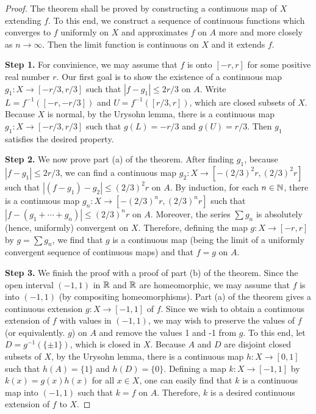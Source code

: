 \begin{proof}
    The theorem shall be proved by constructing a continuous map of $X$ extending $f$.
    To this end, we construct a sequence of continuous functions which converges to $f$ uniformly on $X$ and approximates $f$ on $A$ more and more closely as $n\rightarrow\infty$.
    Then the limit function is continuous on $X$ and it extends $f$.

    \textbf{Step 1.}
    For convinience, we may assume that $f$ is onto $[-r, r]$ for some positive real number $r$.
    Our first goal is to show the existence of a continuous map $g_1: X\rightarrow[-r/3, r/3]$ such that $|f-g_1|\leq 2r/3$ on $A$.
    Write $L=f^{-1}([-r, -r/3])$ and $U=f^{-1}([r/3, r])$, which are closed subsets of $X$.
    Because $X$ is normal, by the Urysohn lemma, there is a continuous map $g_1: X\rightarrow [-r/3, r/3]$ such that $g(L)=-r/3$ and $g(U)=r/3$.
    Then $g_1$ satisfies the desired property.

    \textbf{Step 2.}
    We now prove part (a) of the theorem.
    After finding $g_1$, because $|f-g_1|\leq 2r/3$, we can find a continuous map $g_2: X\rightarrow [-(2/3)^2 r, (2/3)^2 r]$ such that $|(f-g_1)-g_2|\leq (2/3)^2 r$ on $A$.
    By induction, for each $n\in{\mathbb{N}}$, there is a continuous map $g_n: X\rightarrow [-(2/3)^n r, (2/3)^n r]$ such that $|f-(g_1+\cdots+g_n)|\leq(2/3)^n r$ on $A$.
    Moreover, the series $\sum g_n$ is absolutely (hence, uniformly) convergent on $X$.
    Therefore, defining the map $g: X\rightarrow [-r, r]$ by $g=\sum g_n$, we find that $g$ is a continuous map (being the limit of a uniformly convergent sequence of continuous maps) and that $f=g$ on $A$.

    \textbf{Step 3.}
    We finish the proof with a proof of part (b) of the theorem.
    Since the open interval $(-1, 1)$ in ${\mathbb{R}}$ and ${\mathbb{R}}$ are homeomorphic, we may assume that $f$ is into $(-1, 1)$ (by compositing homeomorphisms).
    Part (a) of the theorem gives a continuous extension $g: X\rightarrow [-1, 1]$ of $f$.
    Since we wish to obtain a continuous extension of $f$ with values in $(-1, 1)$, we may wish to preserve the values of $f$ (or equivalently. $g$) on $A$ and remove the values 1 and -1 from $g$.
    To this end, let $D=g^{-1}(\{\pm 1\})$, which is closed in $X$.
    Because $A$ and $D$ are disjoint closed subsets of $X$, by the Urysohn lemma, there is a continuous map $h: X\rightarrow [0, 1]$ such that $h(A)=\{1\}$ and $h(D)=\{0\}$.
    Defining a map $k: X\rightarrow [-1, 1]$ by $k(x)=g(x)h(x)$ for all $x\in X$, one can easily find that $k$ is a continuous map into $(-1, 1)$ such that $k=f$ on $A$.
    Therefore, $k$ is a desired continuous extension of $f$ to $X$.
\end{proof}